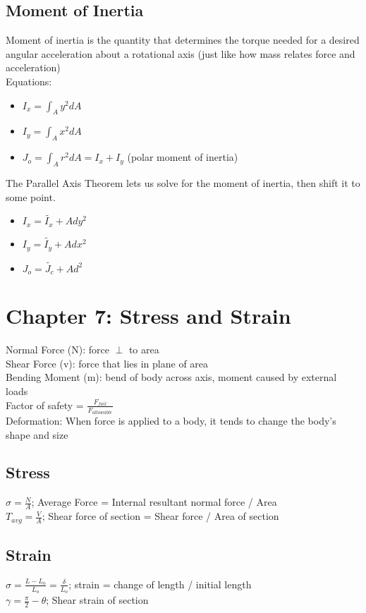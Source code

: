 \documentclass{article}
\begin{document}
    \subsection{Moment of Inertia}
    Moment of inertia is the quantity that determines the torque needed for a desired angular acceleration about a rotational axis (just like how mass relates force and acceleration)\\
    Equations: 
    \begin{itemize}
        \item $I_x = \int_{A}y^2dA$
        \item $I_y = \int_{A}x^2dA$
        \item $J_o = \int_{A}r^2dA = I_x + I_y $ (polar moment of inertia)
    \end{itemize}
    The Parallel Axis Theorem lets us solve for the moment of inertia, then shift it to some point.
    \begin{itemize}
        \item $I_x = \tilde{I_x} + Ady^2$
        \item $I_y = \tilde{I_y} + Adx^2$
        \item $J_o = \tilde{J_c} + Ad^2$
    \end{itemize}

    \newpage

    \section{Chapter 7: Stress and Strain}
    Normal Force (N): force $\perp$ to area \\
    Shear Force (v): force that lies in plane of area \\
    Bending Moment (m): bend of body across axis, moment caused by external loads\\
    Factor of safety = $\frac{F_{fail}}{F_{allowable}}$\\
    Deformation: When force is applied to a body, it tends to change the body's shape and size

    \subsection{Stress}
    $\sigma = \frac{N}{A}$; Average Force = Internal resultant normal force / Area \\
    $T_{avg} = \frac{V}{A}$; Shear force of section = Shear force / Area of section
    
    \subsection{Strain}
    $\sigma = \frac{L-L_o}{L_o}=\frac{\delta}{L_o}$; strain = change of length / initial length \\
    $\gamma= \frac{\pi}{2} - \theta$; Shear strain  of section 
\end{document}
